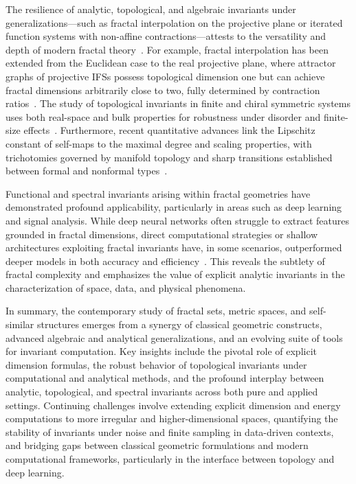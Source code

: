 \documentclass[sigconf]{acmart}
\begin{document}
The resilience of analytic, topological, and algebraic invariants under generalizations—such as fractal interpolation on the projective plane or iterated function systems with non-affine contractions—attests to the versatility and depth of modern fractal theory~\cite{ref25,ref28,ref33,ref34}. For example, fractal interpolation has been extended from the Euclidean case to the real projective plane, where attractor graphs of projective IFSs possess topological dimension one but can achieve fractal dimensions arbitrarily close to two, fully determined by contraction ratios~\cite{ref33}. The study of topological invariants in finite and chiral symmetric systems uses both real-space and bulk properties for robustness under disorder and finite-size effects~\cite{ref25}. Furthermore, recent quantitative advances link the Lipschitz constant of self-maps to the maximal degree and scaling properties, with trichotomies governed by manifold topology and sharp transitions established between formal and nonformal types~\cite{ref34}.

Functional and spectral invariants arising within fractal geometries have demonstrated profound applicability, particularly in areas such as deep learning and signal analysis. While deep neural networks often struggle to extract features grounded in fractal dimensions, direct computational strategies or shallow architectures exploiting fractal invariants have, in some scenarios, outperformed deeper models in both accuracy and efficiency~\cite{ref92}. This reveals the subtlety of fractal complexity and emphasizes the value of explicit analytic invariants in the characterization of space, data, and physical phenomena.

In summary, the contemporary study of fractal sets, metric spaces, and self-similar structures emerges from a synergy of classical geometric constructs, advanced algebraic and analytical generalizations, and an evolving suite of tools for invariant computation. Key insights include the pivotal role of explicit dimension formulas, the robust behavior of topological invariants under computational and analytical methods, and the profound interplay between analytic, topological, and spectral invariants across both pure and applied settings. Continuing challenges involve extending explicit dimension and energy computations to more irregular and higher-dimensional spaces, quantifying the stability of invariants under noise and finite sampling in data-driven contexts, and bridging gaps between classical geometric formulations and modern computational frameworks, particularly in the interface between topology and deep learning.
\end{document}
